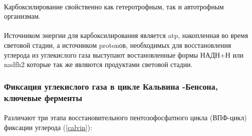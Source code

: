 \paragraph*{}Карбоксилирование свойственно как гетеротрофным, так и автотрофным организмам. 

\paragraph*{}Источником энергии для карбоксилирования является \gls{atp}, накопленная во время световой стадии, а источником \gls{proton}ов, необходимых для восстановления углерода из углекислого газа выступают востановленные формы НАДН+Н или \gls{nadfh2} которые так же являются продуктами световой стадии.

\subsubsection*{Фиксация углекислого газа в цикле Кальвина -Бенсона, ключевые ферменты}

\paragraph*{}Различают три этапа восстановительного пентозофосфатного цикла (ВПФ-цикл) фиксации углерода (\ris \ref{calvin}):

